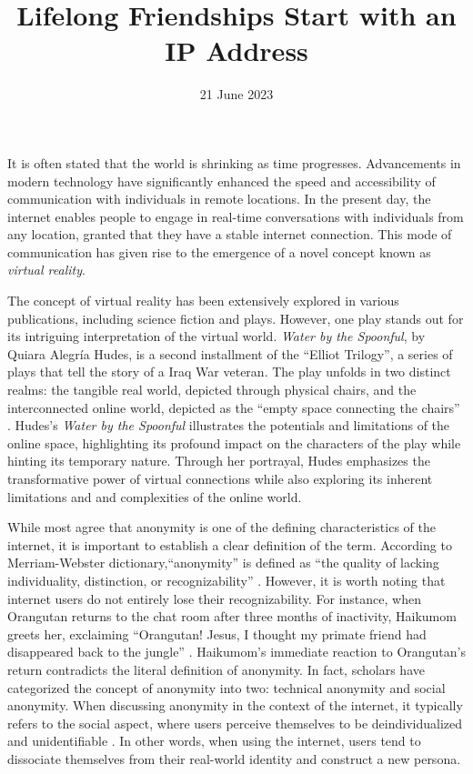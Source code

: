 \documentclass{mla}
\date{21 June 2023}
\title{Lifelong Friendships Start with an IP Address}
\begin{document}
It is often stated that the world is shrinking as time progresses.
Advancements in modern technology have significantly enhanced the speed and accessibility of communication with individuals in remote locations.
In the present day, the internet enables people to engage in real-time conversations with individuals from any location, granted that they have a stable internet connection.
This mode of communication has given rise to the emergence of a novel concept known as \textit{virtual reality}.

The concept of virtual reality has been extensively explored in various publications, including science fiction and plays.
However, one play stands out for its intriguing interpretation of the virtual world.
\textit{Water by the Spoonful}, by Quiara Alegr\'ia Hudes, is a second installment of the ``Elliot Trilogy'', a series of plays that tell the story of a Iraq War veteran.
The play unfolds in two distinct realms: the tangible real world, depicted through physical chairs, and the interconnected online world, depicted as the ``empty space connecting the chairs'' \autocite[3]{Hudes_2017}.
Hudes's \textit{Water by the Spoonful} illustrates the potentials and limitations of the online space, highlighting its profound impact on the characters of the play while hinting its temporary nature.
Through her portrayal, Hudes emphasizes the transformative power of virtual connections while also exploring its inherent limitations and and complexities of the online world.

While most agree that anonymity is one of the defining characteristics of the internet, it is important to establish a clear definition of the term.
According to Merriam-Webster dictionary,``anonymity'' is defined as ``the quality of lacking individuality, distinction, or recognizability'' \autocite{Merriam-Webster}.
However, it is worth noting that internet users do not entirely lose their recognizability.
For instance, when Orangutan returns to the chat room after three months of inactivity, Haikumom greets her, exclaiming ``Orangutan! Jesus, I thought my primate friend had disappeared back to the jungle'' \autocite[13]{Hudes_2017}.
Haikumom's immediate reaction to Orangutan's return contradicts the literal definition of anonymity.
In fact, scholars have categorized the concept of anonymity into two: technical anonymity and social anonymity.
When discussing anonymity in the context of the internet, it typically refers to the social aspect, where users perceive themselves to be deindividualized and unidentifiable \autocite{Hayne_Rice_1997}.
In other words, when using the internet, users tend to dissociate themselves from their real-world identity and construct a new persona.
\end{document}
